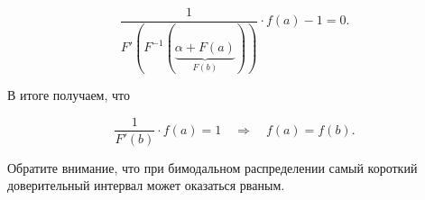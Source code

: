 \begin{problem}
\begin{sol}
\[ \frac{1}{F'(F^{-1}(\underbrace{\alpha + F(a)}_{F(b)}))} \cdot f(a) - 1 = 0.\]

В итоге получаем, что 

\[\frac{1}{F'(b)} \cdot f(a) = 1 \quad \Rightarrow \quad f(a) = f(b).\]

Обратите внимание, что при бимодальном распределении самый короткий доверительный интервал может оказаться рваным. 

\end{sol}
\end{problem}


%
